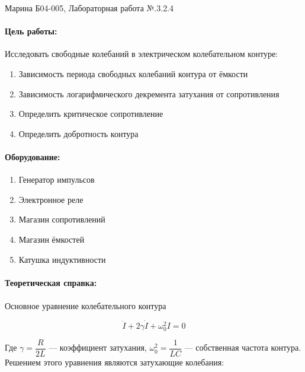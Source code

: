 \documentclass[a4paper,12pt]{article}
\author{Бичина Марина 
группа Б04-005 1 курса ФЭФМ}
\title{}
\date{}
\begin{document}

\begin{center}
\begin{Large}
{ Марина Б04-005, Лабораторная работа №.3.2.4}
\end{Large}
\end{center}
\paragraph{Цель работы:} 
 Исследовать свободные колебаний в электрическом колебательном контуре:
\begin{enumerate}
\itemsep0em
\item Зависимость периода свободных колебаний контура от ёмкости
\item Зависимость логарифмического декремента затухания от сопротивления
\item Определить критическое сопротивление
\item Определить добротность контура
\end{enumerate}
\paragraph{Оборудование:}
\begin{enumerate}
\itemsep0em
\item Генератор импульсов
\item Электронное реле
\item Магазин сопротивлений
\item Магазин ёмкостей
\item Катушка индуктивности
\end{enumerate}


\paragraph{Теоретическая справка:}
\paragraph{}


Основное уравнение колебательного контура 

\begin{equation}\label{ddot I}
\ddot{I} + 2\gamma\dot{I} + \omega_0^2I = 0
\end{equation}

Где $ \gamma = \dfrac{R}{2L} $ --- коэффициент затухания, $ \omega_0^2 = \dfrac{1}{LC} $ --- собственная частота контура. Решением этого уравнения являются затухающие колебания:
\end{document}
